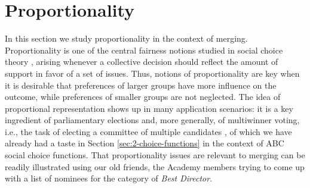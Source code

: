 
 
























\section{Proportionality}\label{sec:5-proportionality}
In this section we study proportionality in the context of merging.
Proportionality is one of the central 
fairness notions studied in social choice theory 
\cite{Black58,Dummett84,Monroe95},
arising whenever a collective decision should reflect the amount of support in favor of a set of issues. 
Thus, notions of proportionality are key when it is 
desirable that preferences of larger groups have more influence on the outcome, 
while preferences of smaller groups are not neglected.
The idea of proportional representation shows up in many application scenarios:
it is a key ingredient of parliamentary elections
\cite{BalinskiY82}
and, more generally, of multiwinner voting, 
i.e., the task of electing a committee of multiple candidates \cite{FaliszewskiSST17},
of which we have already had a taste in Section \ref{sec:2-choice-functions}
in the context of ABC social choice functions.
That proportionality issues are relevant to merging 
can be readily illustrated using our old friends, the Academy members 
trying to come up with a list of nominees for the category of \emph{Best Director}.

